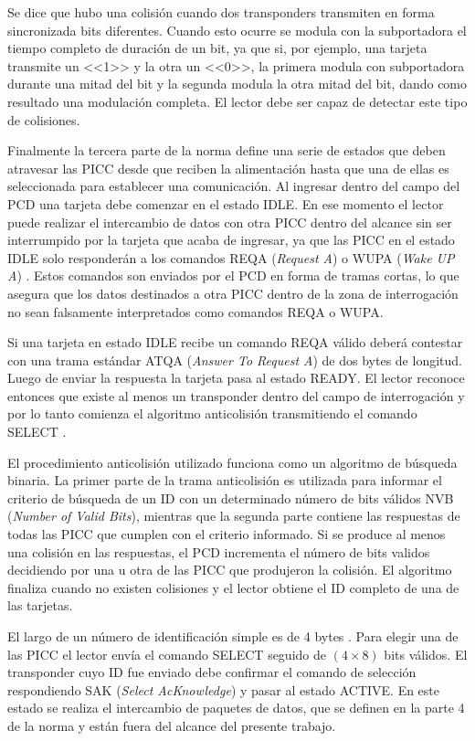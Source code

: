 Se dice que hubo una colisión cuando dos transponders transmiten en forma 
sincronizada bits diferentes. Cuando esto ocurre se modula con la 
subportadora el tiempo completo de duración de un bit, ya que si, por 
ejemplo, una tarjeta transmite un <<1>> y la otra un <<0>>, la primera 
modula con subportadora durante una mitad del bit y la segunda modula la 
otra mitad del bit, dando como resultado una modulación completa. El lector 
debe ser capaz de detectar este tipo de colisiones.

\bigskip
Finalmente la tercera parte de la norma define una serie de estados que 
deben atravesar las PICC desde que reciben la alimentación hasta que una de 
ellas es seleccionada para establecer una comunicación. Al ingresar dentro 
del campo del PCD una tarjeta debe comenzar en el estado IDLE. En ese 
momento el lector puede realizar el intercambio de datos con otra PICC 
dentro del alcance sin ser interrumpido por la tarjeta que acaba de 
ingresar, ya que las PICC en el estado IDLE solo responderán a los comandos 
REQA (\emph{Request A}) o WUPA (\emph{Wake UP A}) \cite[sec.~6.4.1]
{ISO14443Part3}. Estos comandos son enviados por el PCD en forma de tramas 
cortas, lo que asegura que los datos destinados a otra PICC dentro de la 
zona de interrogación no sean falsamente interpretados como comandos REQA o 
WUPA.

Si una tarjeta en estado IDLE recibe un comando REQA válido deberá contestar 
con una trama estándar ATQA (\emph{Answer To Request A}) de dos bytes de 
longitud. Luego de enviar la respuesta la tarjeta pasa al estado READY. El 
lector reconoce entonces que existe al menos un transponder dentro del campo 
de interrogación y por lo tanto comienza el algoritmo anticolisión 
transmitiendo el comando SELECT \cite[sec.~6.4.2]{ISO14443Part3}.

El procedimiento anticolisión utilizado funciona como un algoritmo de 
búsqueda binaria. La primer parte de la trama anticolisión es utilizada para 
informar el criterio de búsqueda de un ID con un determinado número de bits 
válidos NVB (\emph{Number of Valid Bits}), mientras que la segunda parte 
contiene las respuestas de todas las PICC que cumplen con el criterio 
informado. Si se produce al menos una colisión en las respuestas, el PCD 
incrementa el número de bits validos decidiendo por una u otra de las PICC 
que produjeron la colisión. El algoritmo finaliza cuando no existen 
colisiones y el lector obtiene el ID completo de una de las tarjetas.

El largo de un número de identificación simple es de 4 bytes \cite
[sec.~6.5.4]{ISO14443Part3}. Para elegir una de las PICC el lector envía el 
comando SELECT seguido de \((4 \times 8)\) bits válidos. El transponder cuyo 
ID fue enviado debe confirmar el comando de selección respondiendo SAK (\emph
{Select AcKnowledge}) y pasar al estado ACTIVE. En este estado se realiza el 
intercambio de paquetes de datos, que se definen en la parte 4 de la norma y 
están fuera del alcance del presente trabajo.

